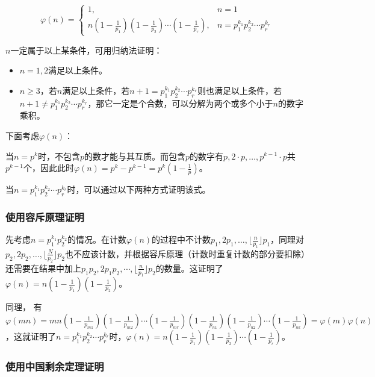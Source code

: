 \documentclass[a4paper]{article}         %
\begin{document}
\[
	\varphi(n)=\begin{cases}
		1, &n = 1\\
		n(1- \frac{1}{p_1})(1-\frac{1}{p_2}) \cdots (1-\frac{1}{p_r}), &n = p_{1}^{k_1} p_{2}^{k_2} \cdots p_{r}^{k_r}
	\end{cases}
\]

$n$一定属于以上某条件，可用归纳法证明：

\begin{itemize}
	\item $n=1, 2$满足以上条件。
	\item $n \geq 3$，若$n$满足以上条件，若$n+1 = p_{1}^{k_1}p_{2}^{k_2}\cdots p_{r}^{k_r}$则也满足以上条件，若$n+1 \neq p_{1}^{k_1}p_{2}^{k_2}\cdots p_{r}^{k_r}$，那它一定是个合数，可以分解为两个或多个小于$n$的数字乘积。
\end{itemize}

下面考虑$\varphi(n)$：

当$n = p^k$时，不包含$p$的数才能与其互质。而包含$p$的数字有$p,2\cdot p,\ldots ,p^{k-1}\cdot p$共$p^{k-1}$个，因此此时$\varphi(n) = p^k - p^{k-1} = p^k (1 - \frac{1}{p} )$。

当$n = p_{1}^{k_1}p_{2}^{k_2}\cdots p_{r}^{k_r}$时，可以通过以下两种方式证明该式。

\subsubsection{使用容斥原理证明}

\begin{sloppypar}
先考虑$n = p_{1}^{k_1}p_{2}^{k_2}$的情况。在计数$\varphi(n)$的过程中不计数$p_1, 2p_1, \ldots, \lfloor \frac{n}{p_1} \rfloor p_1$，同理对$p_2, 2p_2, \ldots, \lfloor \frac{N}{p_2} \rfloor p_2$也不应该计数，并根据容斥原理（计数时重复计数的部分要扣除）还需要在结果中加上$p_1p_2, 2p_1p_2, \cdots, \lfloor \frac{n}{p_1} \rfloor p_2$的数量。这证明了$\varphi(n)=n(1-\frac{1}{p_1})(1-\frac{1}{p_2})$。
\end{sloppypar}

同理，%
有$\varphi(mn)=mn(1-\frac{1}{p_{m1}})(1-\frac{1}{p_{m2}}) \cdots (1-\frac{1}{p_{mr}})(1-\frac{1}{p_{n1}})(1-\frac{1}{p_{n2}}) \cdots (1-\frac{1}{p_{nk}}) = \varphi(m)\varphi(n)$，这就证明了$n = p_{1}^{k_1}p_{2}^{k_2} \cdots p_{r}^{k_r}$时，$\varphi(n)=n(1-\frac{1}{p_1})(1-\frac{1}{p_2}) \cdots (1-\frac{1}{p_r})$。

\subsubsection{使用中国剩余定理证明}
\end{document}
